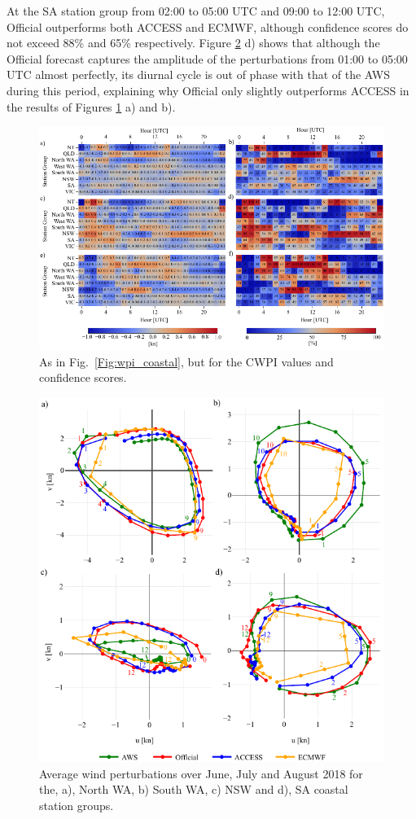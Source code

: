 \documentclass{ametsoc}
\begin{document}
At the SA station group from 02:00 to 05:00 UTC and 09:00 to 12:00 UTC, Official outperforms both ACCESS and ECMWF, although confidence scores do not exceed 88\% and 65\% respectively. Figure \ref{Fig:clim_hodo} d) shows that although the Official forecast captures the amplitude of the perturbations from 01:00 to 05:00 UTC almost perfectly, its diurnal cycle is out of phase with that of the AWS during this period, explaining why Official only slightly outperforms ACCESS in the results of Figures \ref{Fig:cwpi_coastal} a) and b).

\begin{figure}
\centering
\includegraphics[width=39pc]{cwpi_coastal.pdf}
\caption{As in Fig.~\ref{Fig:wpi_coastal}, but for the CWPI values and confidence scores.}
\label{Fig:cwpi_coastal}
\end{figure}

\begin{figure}
\centering
\includegraphics[width=33pc]{clim_hodo.pdf}
\caption{Average wind perturbations over June, July and August 2018 for the, a), North WA, b) South WA, c) NSW and d), SA coastal station groups.}
\label{Fig:clim_hodo}
\end{figure}
\end{document}
